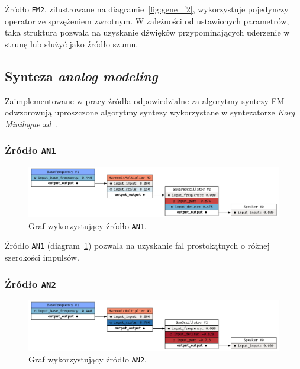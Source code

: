 Źródło \texttt{FM2}, zilustrowane na diagramie~\ref{fig:gene_f2}, wykorzystuje pojedynczy
operator ze sprzężeniem zwrotnym. W zależności od ustawionych parametrów, taka struktura pozwala
na uzyskanie dźwięków przypominających uderzenie w strunę lub służyć jako źródło szumu.

\subsection{Synteza \textit{analog modeling}}

Zaimplementowane w pracy źródła odpowiedzialne za algorytmy syntezy FM odwzorowują uproszczone algorytmy syntezy wykorzystane
w syntezatorze \textit{Korg Minilogue xd}~\cite{yamaha_dx7_manual}.

\subsubsection{Źródło \texttt{AN1}}

\begin{figure}[H]
    \centering
    \includegraphics[width=1.0\linewidth]{rys06/gene_an1.png}
    \caption{
      Graf wykorzystujący źródło \texttt{AN1}.
    }\label{fig:gene_an1}
\end{figure}

Źródło \texttt{AN1} (diagram~\ref{fig:gene_an1}) pozwala na uzyskanie fal prostokątnych o różnej szerokości impulsów.


\subsubsection{Źródło \texttt{AN2}}

\begin{figure}[H]
    \centering
    \includegraphics[width=1.0\linewidth]{rys06/gene_an2.png}
    \caption{
      Graf wykorzystujący źródło \texttt{AN2}.
    }\label{fig:gene_an2}
\end{figure}

